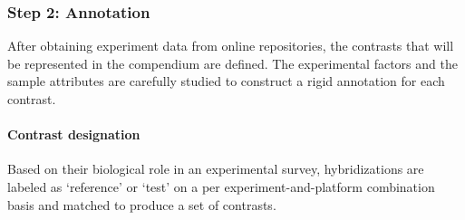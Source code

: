 




\subsubsection{Step 2: Annotation}


%
After obtaining experiment data from online repositories, the contrasts that
will be represented in the compendium are defined.  The experimental factors
and the sample attributes are carefully studied to construct a rigid annotation
for each contrast. %
%


\paragraph{Contrast designation}
Based on their biological role in an experimental survey, hybridizations are
labeled as `reference' or `test' on a per experiment-and-platform combination
basis and matched to produce a set of contrasts.

